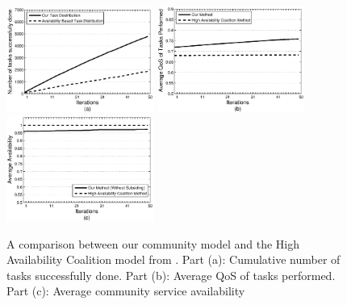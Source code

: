 \begin{figure}%
\centering
\includegraphics[width=1.9in]{avg_task_ws_done.eps}
\includegraphics[width=1.9in]{avg_qos_ws_done.eps}
\includegraphics[width=1.9in]{avg_avail_ws_done.eps}
\caption{A comparison between our community model and the High
Availability Coalition model from \cite{10.1109/TSC.2012.12}. Part
(a): Cumulative number of tasks successfully done. Part (b):
Average QoS of tasks performed. Part (c): Average community
service availability} \label{fig_avail_method}
\end{figure}

